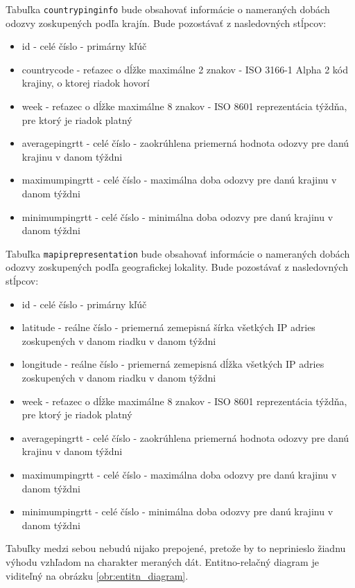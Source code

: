 Tabuľka \lstinline{countrypinginfo} bude obsahovať 
informácie o nameraných dobách odozvy zoskupených podľa krajín. Bude pozostávať z nasledovných stĺpcov:
\begin{itemize}
    \item id - celé číslo - primárny kľúč
    \item countrycode - reťazec o dĺžke maximálne 2 znakov - ISO 3166-1 Alpha 2 kód krajiny, o ktorej riadok hovorí
    \item week - reťazec o dĺžke maximálne 8 znakov - ISO 8601 reprezentácia týždňa, pre ktorý je riadok platný
    \item averagepingrtt - celé číslo - zaokrúhlena priemerná hodnota odozvy pre danú krajinu v danom týždni
    \item maximumpingrtt - celé číslo - maximálna doba odozvy pre danú krajinu v danom týždni
    \item minimumpingrtt - celé číslo - minimálna doba odozvy pre danú krajinu v danom týždni
\end{itemize}

Tabuľka \lstinline{mapiprepresentation} bude obsahovať informácie o nameraných dobách 
odozvy zoskupených podľa geografickej lokality. Bude pozostávať z nasledovných stĺpcov:
\begin{itemize}
    \item id - celé číslo - primárny kľúč
    \item latitude - reálne číslo - priemerná zemepisná šírka všetkých IP adries zoskupených v danom riadku v danom týždni
    \item longitude - reálne číslo - priemerná zemepisná dĺžka všetkých IP adries zoskupených v danom riadku v danom týždni
    \item week - reťazec o dĺžke maximálne 8 znakov - ISO 8601 reprezentácia týždňa, pre ktorý je riadok platný
    \item averagepingrtt - celé číslo - zaokrúhlena priemerná hodnota odozvy pre danú krajinu v danom týždni
    \item maximumpingrtt - celé číslo - maximálna doba odozvy pre danú krajinu v danom týždni
    \item minimumpingrtt - celé číslo - minimálna doba odozvy pre danú krajinu v danom týždni
\end{itemize}

Tabuľky medzi sebou nebudú nijako prepojené, pretože by to neprinieslo žiadnu výhodu vzhľadom na charakter 
meraných dát. Entitno-relačný diagram je viditeľný na obrázku \ref{obr:entitn_diagram}.

